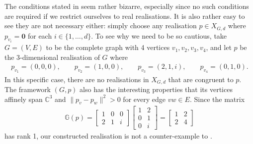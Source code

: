 \documentclass[ALCO]{cedram}
\begin{document}
The conditions stated in  seem rather bizarre,
especially since no such conditions are required if we restrict ourselves to real realisations.
It is also rather easy to see they are not necessary either:
simply choose any realisation $p \in X_{G,d}$ where $p_{v_i} = \mathbf{0}$ for each $i \in \{1,\ldots,d\}$.
To see why we need to be so cautious,
take $G=(V,E)$ to be the complete graph with 4 vertices $v_1,v_2,v_3,v_4$,
and let $p$ be the 3-dimensional realisation of $G$ where
\begin{align*}
	p_{v_1} = (0,0,0), \qquad p_{v_2} = (1,0,0), \qquad p_{v_3} = (2,1,i), \qquad p_{v_4} = (0,1,0).
\end{align*}
In this specific case, there are no realisations in $X_{G,d}$ that are congruent to $p$.
The framework $(G,p)$ also has the interesting properties that its vertices affinely span $\mathbb{C}^3$ and $\|p_v-p_w\|^2 >0$ for every edge $vw \in E$.
Since the matrix
\begin{align*}
	\mathbb{G}(p) =
	\begin{bmatrix}
		1 & 0 & 0 \\
		2 & 1 & i
	\end{bmatrix}
	\begin{bmatrix}
		1 & 2 \\
		0 & 1 \\
		0 & i
	\end{bmatrix}
	=
	\begin{bmatrix}
		1 & 2 \\
		2 & 4
	\end{bmatrix}
\end{align*}
has rank 1,
our constructed realisation is not a counter-example to .
\end{document}
